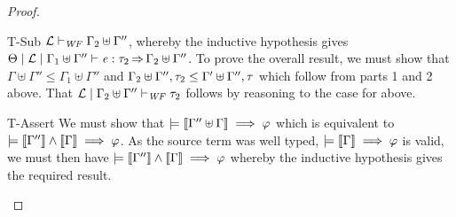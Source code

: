 \begin{proof}
\begin{enumerate}
\begin{rneqncase}{T-Sub}
      $ \mathcal{L}   \vdash _{\mathit{WF}}   \Gamma_{{\mathrm{2}}}  \uplus  \Gamma''  $, whereby the inductive hypothesis gives
      $ \Theta   \mid   \mathcal{L}   \mid    \Gamma_{{\mathrm{1}}}  \uplus  \Gamma''    \vdash   \mathit{e}  :  \tau_{{\mathrm{2}}}   \operatorname{\Rightarrow}    \Gamma_{{\mathrm{2}}}  \uplus  \Gamma''  $. To prove the overall result, we must
      show that $ \Gamma  \uplus  \Gamma''   \leq   \Gamma_{{\mathrm{1}}}  \uplus  \Gamma'' $ and $ \Gamma_{{\mathrm{2}}}  \uplus  \Gamma''   ,  \tau_{{\mathrm{2}}}  \leq   \Gamma'  \uplus  \Gamma''   ,  \tau$
      which follow from parts 1 and 2 above.
      That $ \mathcal{L}   \mid    \Gamma_{{\mathrm{2}}}  \uplus  \Gamma''    \vdash _{\mathit{WF}}  \tau_{{\mathrm{2}}} $ follows by reasoning to the case for  above.
    \end{rneqncase}
    \begin{rncase}{T-Assert}
      We must show that $\models   \left\llbracket{  \Gamma''  \uplus  \Gamma  }\right\rrbracket   \implies  \varphi$ which is equivalent to
      $\models   \left\llbracket{ \Gamma'' }\right\rrbracket   \wedge   \left\llbracket{ \Gamma }\right\rrbracket   \implies  \varphi$. As the source term was well typed,
      $\models   \left\llbracket{ \Gamma }\right\rrbracket   \implies  \varphi$ is valid, we must then have $\models   \left\llbracket{ \Gamma'' }\right\rrbracket   \wedge   \left\llbracket{ \Gamma }\right\rrbracket   \implies  \varphi$
      whereby the inductive hypothesis gives the required result.
    \end{rncase}
  \end{enumerate}
\end{proof}

